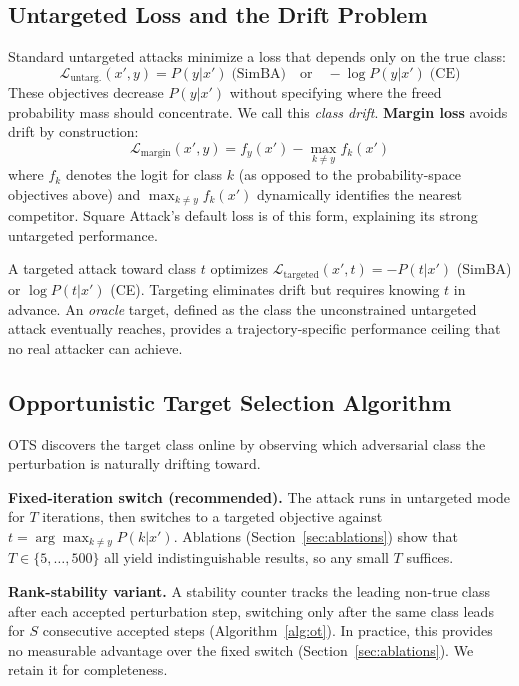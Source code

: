 \documentclass{cap2026}
\begin{document}
\subsection{Untargeted Loss and the Drift Problem}\label{sec:drift}

Standard untargeted attacks minimize a loss that depends only on the true class:
\begin{equation}
\mathcal{L}_{\text{untarg.}}(x', y) = P(y | x') \;\text{(SimBA)} \quad \text{or} \quad -\log P(y | x') \;\text{(CE)}
\end{equation}
These objectives decrease $P(y|x')$ without specifying where the freed probability mass should concentrate. We call this \textit{class drift}. \textbf{Margin loss} avoids drift by construction:
\begin{equation}
\mathcal{L}_{\text{margin}}(x', y) = f_y(x') - \max_{k \neq y} f_k(x')
\end{equation}
where $f_k$ denotes the logit for class $k$ (as opposed to the probability-space objectives above) and $\max_{k \neq y} f_k(x')$ dynamically identifies the nearest competitor. Square Attack's default loss is of this form, explaining its strong untargeted performance.

A targeted attack toward class $t$ optimizes $\mathcal{L}_{\text{targeted}}(x', t) = -P(t | x')$ (SimBA) or $\log P(t | x')$ (CE). Targeting eliminates drift but requires knowing $t$ in advance. An \textit{oracle} target, defined as the class the unconstrained untargeted attack eventually reaches, provides a trajectory-specific performance ceiling that no real attacker can achieve.

\subsection{Opportunistic Target Selection Algorithm}\label{sec:algorithm}

OTS discovers the target class online by observing which adversarial class the perturbation is naturally drifting toward.

\textbf{Fixed-iteration switch (recommended).} The attack runs in untargeted mode for $T$ iterations, then switches to a targeted objective against $t = \arg\max_{k \neq y} P(k|x')$. Ablations (Section~\ref{sec:ablations}) show that $T \in \{5, \ldots, 500\}$ all yield indistinguishable results, so any small $T$ suffices.

\textbf{Rank-stability variant.} A stability counter tracks the leading non-true class after each accepted perturbation step, switching only after the same class leads for $S$ consecutive accepted steps (Algorithm~\ref{alg:ot}). In practice, this provides no measurable advantage over the fixed switch (Section~\ref{sec:ablations}). We retain it for completeness.
\end{document}
